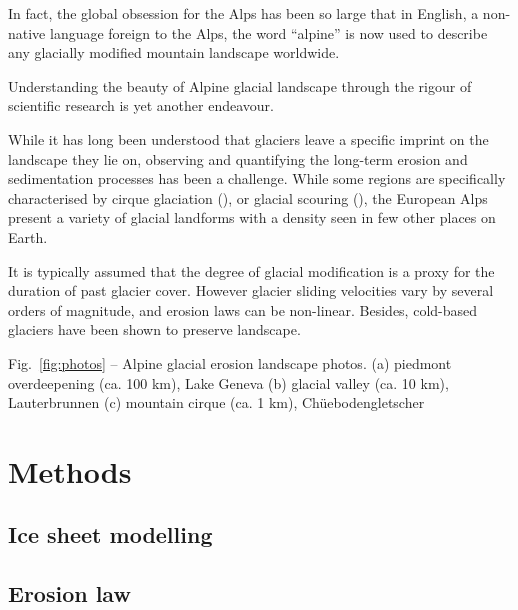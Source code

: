 \documentclass[utf8]{article}
\begin{document}
    In fact, the global obsession for the Alps has been so large that in
    English, a non-native language foreign to the Alps, the word “alpine” is
    now used to describe any glacially modified mountain landscape worldwide.

    Understanding the beauty of Alpine glacial landscape through the rigour of
    scientific research is yet another endeavour.

    While it has long been understood that glaciers leave a specific imprint on
    the landscape they lie on, observing and quantifying the long-term erosion
    and sedimentation processes has been a challenge. While some regions are
    specifically characterised by cirque glaciation (), or glacial scouring (),
    the European Alps present a variety of glacial landforms with a density
    seen in few other places on Earth.

    It is typically assumed that the degree of glacial modification is a proxy
    for the duration of past glacier cover. However glacier sliding velocities
    vary by several orders of magnitude, and erosion laws can be non-linear.
    Besides, cold-based glaciers have been shown to preserve landscape.

    Fig.~\ref{fig:photos} -- Alpine glacial erosion landscape photos.
        (a) piedmont overdeepening (ca. 100 km), Lake Geneva
        (b) glacial valley (ca. 10 km), Lauterbrunnen
        (c) mountain cirque (ca. 1 km), Chüebodengletscher

\section{Methods}

\subsection{Ice sheet modelling}

\subsection{Erosion law}
\end{document}
